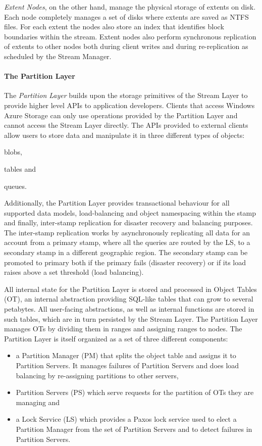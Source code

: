 \emph{Extent Nodes}, on the other hand, manage the physical storage of extents on disk.
Each node completely manages a set of disks where extents are saved as NTFS files.
For each extent the nodes also store an index that identifies block boundaries within the stream.
Extent nodes also perform synchronous replication of extents to other nodes both during client writes and during re-replication as scheduled by the Stream Manager.

\paragraph{The Partition Layer}

The \emph{Partition Layer} builds upon the storage primitives of the Stream Layer to provide higher level APIs to application developers.
Clients that access Windows Azure Storage can only use operations provided by the Partition Layer and cannot access the Stream Layer directly.
The APIs provided to external clients allow users to store data and manipulate it in three different types of objects: \begin{inparaenum}[i)]
    \item blobs,
    \item tables and
    \item queues.
\end{inparaenum}
Additionally, the Partition Layer provides transactional behaviour for all supported data models, load-balancing and object namespacing within the stamp and finally, inter-stamp replication for disaster recovery and balancing purposes.
The inter-stamp replication works by asynchronously replicating all data for an account from a primary stamp, where all the queries are routed by the LS, to a secondary stamp in a different geographic region.
The secondary stamp can be promoted to primary both if the primary fails (disaster recovery) or if its load raises above a set threshold (load balancing).

All internal state for the Partition Layer is stored and processed in Object Tables (OT), an internal abstraction providing SQL-like tables that can grow to several petabytes.
All user-facing abstractions, as well as internal functions are stored in such tables, which are in turn persisted by the Stream Layer.
The Partition Layer manages OTs by dividing them in ranges and assigning ranges to nodes.
The Partition Layer is itself organized as a set of three different components:
\begin{itemize}
    \item a Partition Manager (PM) that splits the object table and assigns it to Partition Servers. It manages failures of Partition Servers and does load balancing by re-assigning partitions to other servers,
    \item Partition Servers (PS) which serve requests for the partition of OTs they are managing and
    \item a Lock Service (LS) which provides a Paxos \cite{DBLP:journals/tocs/Lamport98} lock service used to elect a Partition Manager from the set of Partition Servers and to detect failures in Partition Servers.
\end{itemize}

\clearpage
